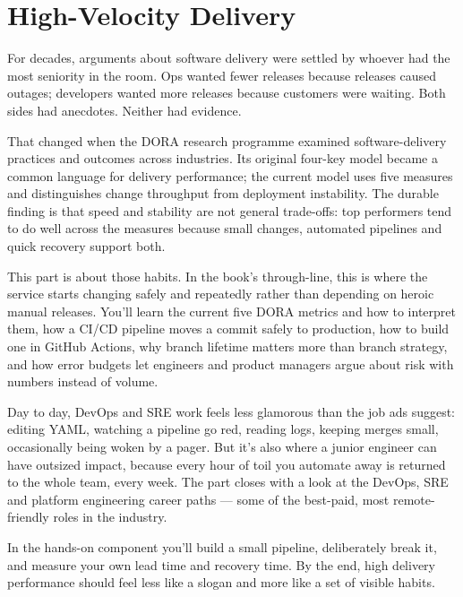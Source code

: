 
\chapter{High-Velocity Delivery}

For decades, arguments about software delivery were settled by whoever had the most seniority in the room. Ops wanted fewer releases because releases caused outages; developers wanted more releases because customers were waiting. Both sides had anecdotes. Neither had evidence.


That changed when the DORA research programme examined software-delivery practices and outcomes across industries. Its original four-key model became a common language for delivery performance; the current model uses five measures and distinguishes change throughput from deployment instability. The durable finding is that speed and stability are not general trade-offs: top performers tend to do well across the measures because small changes, automated pipelines and quick recovery support both. \autocite{dora-research,dora-metrics}


This part is about those habits. In the book's through-line, this is where the service starts changing safely and repeatedly rather than depending on heroic manual releases. You'll learn the current five DORA metrics and how to interpret them, how a CI/CD pipeline moves a commit safely to production, how to build one in GitHub Actions, why branch lifetime matters more than branch strategy, and how error budgets let engineers and product managers argue about risk with numbers instead of volume. \autocite{github-workflows,google-error-budget}


Day to day, DevOps and SRE work feels less glamorous than the job ads suggest: editing YAML, watching a pipeline go red, reading logs, keeping merges small, occasionally being woken by a pager. But it's also where a junior engineer can have outsized impact, because every hour of toil you automate away is returned to the whole team, every week. The part closes with a look at the DevOps, SRE and platform engineering career paths — some of the best-paid, most remote-friendly roles in the industry.


In the hands-on component you'll build a small pipeline, deliberately break it, and measure your own lead time and recovery time. By the end, high delivery performance should feel less like a slogan and more like a set of visible habits.

